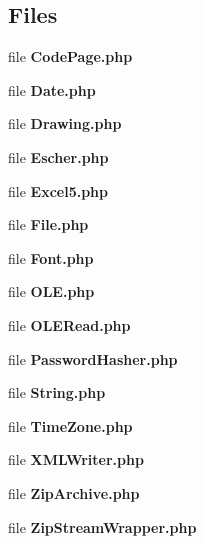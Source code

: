 \subsection*{Files}
\begin{DoxyCompactItemize}
\item 
file {\bfseries Code\+Page.\+php}
\item 
file {\bfseries Date.\+php}
\item 
file {\bfseries Drawing.\+php}
\item 
file {\bfseries Escher.\+php}
\item 
file {\bfseries Excel5.\+php}
\item 
file {\bfseries File.\+php}
\item 
file {\bfseries Font.\+php}
\item 
file {\bfseries O\+L\+E.\+php}
\item 
file {\bfseries O\+L\+E\+Read.\+php}
\item 
file {\bfseries Password\+Hasher.\+php}
\item 
file {\bfseries String.\+php}
\item 
file {\bfseries Time\+Zone.\+php}
\item 
file {\bfseries X\+M\+L\+Writer.\+php}
\item 
file {\bfseries Zip\+Archive.\+php}
\item 
file {\bfseries Zip\+Stream\+Wrapper.\+php}
\end{DoxyCompactItemize}
